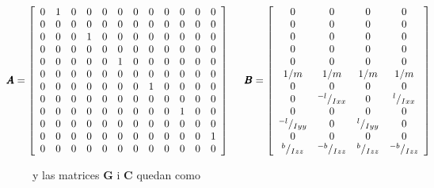 \documentclass[twoside,11pt]{book}
\begin{document}
\begin{equation}
\hspace*{-0.9cm}\pmb{A}=\left[ \begin{array}{cccccccccccc}
0 & 1 & 0 & 0 & 0 & 0 & 0 & 0 & 0 & 0 & 0 & 0 \\
0 & 0 & 0 & 0 & 0 & 0 & 0 & 0 & 0 & 0 & 0 & 0 \\
0 & 0 & 0 & 1 & 0 & 0 & 0 & 0 & 0 & 0 & 0 & 0 \\
0 & 0 & 0 & 0 & 0 & 0 & 0 & 0 & 0 & 0 & 0 & 0 \\
0 & 0 & 0 & 0 & 0 & 1 & 0 & 0 & 0 & 0 & 0 & 0 \\
0 & 0 & 0 & 0 & 0 & 0 & 0 & 0 & 0 & 0 & 0 & 0 \\
0 & 0 & 0 & 0 & 0 & 0 & 0 & 1 & 0 & 0 & 0 & 0 \\
0 & 0 & 0 & 0 & 0 & 0 & 0 & 0 & 0 & 0 & 0 & 0 \\
0 & 0 & 0 & 0 & 0 & 0 & 0 & 0 & 0 & 1 & 0 & 0 \\
0 & 0 & 0 & 0 & 0 & 0 & 0 & 0 & 0 & 0 & 0 & 0 \\
0 & 0 & 0 & 0 & 0 & 0 & 0 & 0 & 0 & 0 & 0 & 1 \\
0 & 0 & 0 & 0 & 0 & 0 & 0 & 0 & 0 & 0 & 0 & 0 \\ \end{array} \right] \hspace*{0.5cm} \pmb{B} = \left[ \begin{array}{cccc}
0 & 0 & 0 & 0 \\
0 & 0 & 0 & 0 \\
0 & 0 & 0 & 0 \\
0 & 0 & 0 & 0 \\
0 & 0 & 0 & 0 \\
1/m & 1/m & 1/m & 1/m \\ 
0 & 0 & 0 & 0 \\
0 & {}^{-l}/_{Ixx} & 0 & {}^{l}/_{Ixx} \\ 
0 & 0 & 0 & 0 \\
{}^{-l}/_{Iyy} & 0 & {}^{l}/_{Iyy} & 0 \\
0 & 0 & 0 & 0 \\
{}^{b}/_{Izz} & {}^{-b}/_{Izz} & {}^{b}/_{Izz} & {}^{-b}/_{Izz} \\ \end{array} \right]
\end{equation}

y las matrices $\pmb{G}$ i $\pmb{C}$ quedan como 
\end{document}

